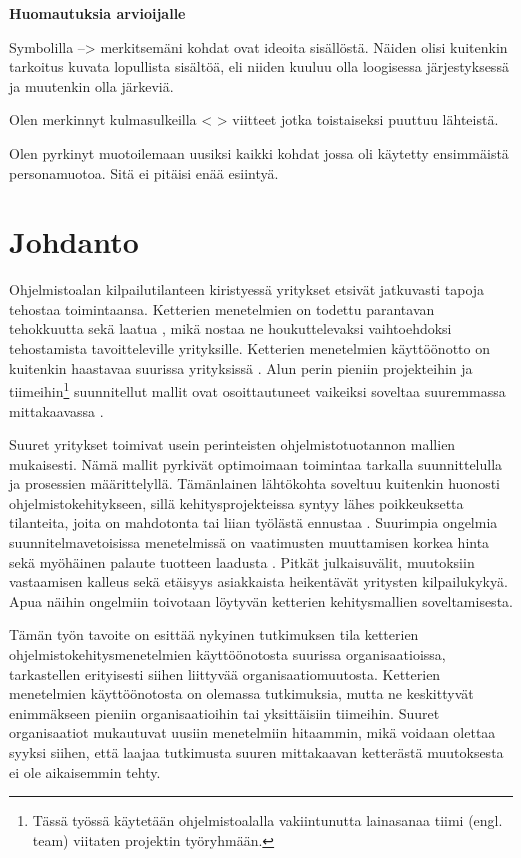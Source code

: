 
\textbf{Huomautuksia arvioijalle}

Symbolilla --> merkitsemäni kohdat ovat ideoita sisällöstä. Näiden olisi
kuitenkin tarkoitus kuvata lopullista sisältöä, eli niiden kuuluu olla
loogisessa järjestyksessä ja muutenkin olla järkeviä.

Olen merkinnyt kulmasulkeilla < > viitteet jotka toistaiseksi puuttuu lähteistä.

Olen pyrkinyt muotoilemaan uusiksi kaikki kohdat jossa oli käytetty ensimmäistä
personamuotoa. Sitä ei pitäisi enää esiintyä.

\newpage

\section{Johdanto}

Ohjelmistoalan kilpailutilanteen kiristyessä yritykset etsivät jatkuvasti tapoja
tehostaa toimintaansa. Ketterien menetelmien on todettu parantavan tehokkuutta
sekä laatua , mikä nostaa ne houkuttelevaksi vaihtoehdoksi
tehostamista tavoitteleville yrityksille. Ketterien menetelmien käyttöönotto on
kuitenkin haastavaa suurissa yrityksissä . Alun perin pieniin
projekteihin ja tiimeihin\footnote{Tässä työssä käytetään ohjelmistoalalla
vakiintunutta lainasanaa tiimi (engl. team) viitaten projektin työryhmään.}
suunnitellut mallit ovat osoittautuneet vaikeiksi soveltaa suuremmassa
mittakaavassa .

Suuret yritykset toimivat usein perinteisten ohjelmistotuotannon mallien
mukaisesti. Nämä mallit pyrkivät optimoimaan toimintaa tarkalla suunnittelulla
ja prosessien määrittelyllä. Tämänlainen lähtökohta soveltuu kuitenkin huonosti
ohjelmistokehitykseen, sillä kehitysprojekteissa syntyy lähes poikkeuksetta
tilanteita, joita on mahdotonta tai liian työlästä ennustaa .
Suurimpia ongelmia suunnitelmavetoisissa menetelmissä on vaatimusten muuttamisen
korkea hinta sekä myöhäinen palaute tuotteen laadusta .
Pitkät julkaisuvälit, muutoksiin vastaamisen kalleus sekä etäisyys asiakkaista
heikentävät yritysten kilpailukykyä. Apua näihin ongelmiin toivotaan löytyvän
ketterien kehitysmallien soveltamisesta.

Tämän työn tavoite on esittää nykyinen tutkimuksen tila ketterien
ohjelmistokehitysmenetelmien käyttöönotosta suurissa organisaatioissa,
tarkastellen erityisesti siihen liittyvää organisaatiomuutosta. Ketterien
menetelmien käyttöönotosta on olemassa tutkimuksia, mutta ne keskittyvät
enimmäkseen pieniin organisaatioihin tai yksittäisiin tiimeihin. Suuret
organisaatiot mukautuvat uusiin menetelmiin hitaammin, mikä voidaan olettaa
syyksi siihen, että laajaa tutkimusta suuren mittakaavan ketterästä muutoksesta
ei ole aikaisemmin tehty.

